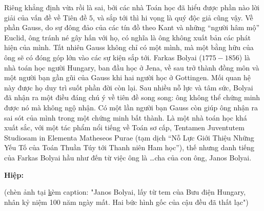 \begin{multicols}{2}
	\vskip 0.1cm
	Riêng khẳng định vừa rồi là sai, bởi các nhà Toán học đã hiểu được phần nào lời giải của vấn đề về Tiên đề $5$, và sắp tới thì hi vọng là quý độc giả cũng vậy. Về phần Gauss, do sự đông đảo của các tín đồ theo Kant và những ``người hâm mộ'' Euclid, ông tránh né gây hấn với họ, có nghĩa là ông không xuất bản các phát hiện của mình. Tất nhiên Gauss không chỉ có một mình, mà một bằng hữu của ông sẽ có đóng góp lớn vào các sự kiện sắp tới.
	\vskip 0.1cm
	Farkas Bolyai ($1775-1856$) là nhà toán học người Hungary, ban đầu học ở Jena, về sau trở thành đồng môn và một người bạn gần gũi của Gauss khi hai người học ở Gottingen. Mối quan hệ này được họ duy trì suốt phần đời còn lại. 
	\vskip 0.1cm
	Sau nhiều nỗ lực và tâm sức, Bolyai đã nhận ra một điều đáng chú ý về tiên đề song song: ông không thể chứng minh được nó mà không ngộ nhận. Có một lần người bạn Gauss còn giúp ông nhận ra sai sót của mình trong một chứng minh bất thành. Là một nhà toán học khá xuất sắc, với một tác phẩm nổi tiếng về Toán sơ cấp, Tentamen Juventutem Studiosam in Elementa Matheseos Purae (tạm dịch ``Nỗ Lực Giới Thiệu Những Yếu Tố của Toán Thuần Túy tới Thanh niên Ham học''), thế nhưng danh tiếng của Farkas Bolyai hầu như đến từ việc ông là \ldots cha của con ông, Janos Bolyai. 
	
\textbf{Hiệp:}

(chèn ảnh tại \href{https://commons.wikimedia.org/wiki/File:JanosBolyai.jpg} kèm caption: "Janos Bolyai, lấy từ tem của Bưu điện Hungary, nhân kỷ niệm 100 năm ngày mất. Hai bức hình gốc của cậu đều đã thất lạc")	
	

\end{multicols}
